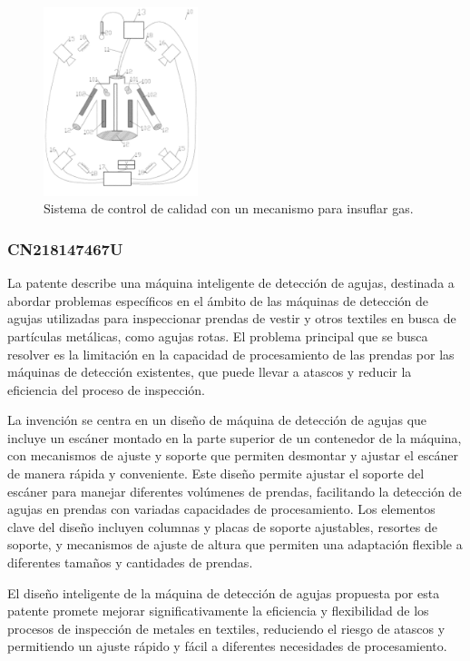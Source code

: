 \begin{figure}[H]
	\centering
	\includegraphics[width=0.4\textwidth]{img/imgf0001.png}
	\caption{Sistema de control de calidad con un mecanismo para insuflar gas.}
	\label{fig:imgf0001}
\end{figure}

\subsubsection{CN218147467U}

La patente \cite{CN218147467U} describe una máquina inteligente de detección de agujas, destinada a abordar problemas específicos en el ámbito de las máquinas de detección de agujas utilizadas para inspeccionar prendas de vestir y otros textiles en busca de partículas metálicas, como agujas rotas. El problema principal que se busca resolver es la limitación en la capacidad de procesamiento de las prendas por las máquinas de detección existentes, que puede llevar a atascos y reducir la eficiencia del proceso de inspección.

La invención se centra en un diseño de máquina de detección de agujas que incluye un escáner montado en la parte superior de un contenedor de la máquina, con mecanismos de ajuste y soporte que permiten desmontar y ajustar el escáner de manera rápida y conveniente. Este diseño permite ajustar el soporte del escáner para manejar diferentes volúmenes de prendas, facilitando la detección de agujas en prendas con variadas capacidades de procesamiento. Los elementos clave del diseño incluyen columnas y placas de soporte ajustables, resortes de soporte, y mecanismos de ajuste de altura que permiten una adaptación flexible a diferentes tamaños y cantidades de prendas.

El diseño inteligente de la máquina de detección de agujas propuesta por esta patente promete mejorar significativamente la eficiencia y flexibilidad de los procesos de inspección de metales en textiles, reduciendo el riesgo de atascos y permitiendo un ajuste rápido y fácil a diferentes necesidades de procesamiento.

